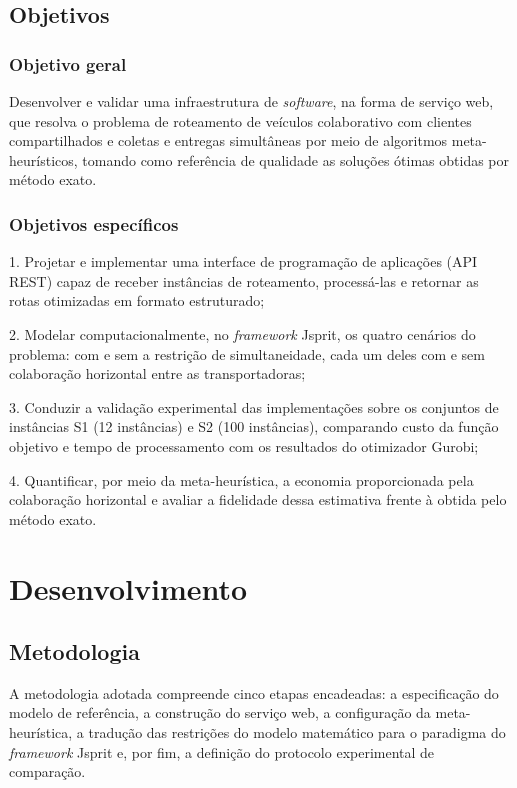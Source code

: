 \documentclass[a4paper,12pt]{article}
\begin{document}
\subsection{Objetivos}
\subsubsection{Objetivo geral}
Desenvolver e validar uma infraestrutura de \textit{software}, na forma de serviço web, que resolva o problema de roteamento de veículos colaborativo com clientes compartilhados e coletas e entregas simultâneas por meio de algoritmos meta-heurísticos, tomando como referência de qualidade as soluções ótimas obtidas por método exato.

\subsubsection{Objetivos específicos}
1. Projetar e implementar uma interface de programação de aplicações (API REST) capaz de receber instâncias de roteamento, processá-las e retornar as rotas otimizadas em formato estruturado;

2. Modelar computacionalmente, no \textit{framework} Jsprit, os quatro cenários do problema: com e sem a restrição de simultaneidade, cada um deles com e sem colaboração horizontal entre as transportadoras;

3. Conduzir a validação experimental das implementações sobre os conjuntos de instâncias S1 (12 instâncias) e S2 (100 instâncias), comparando custo da função objetivo e tempo de processamento com os resultados do otimizador Gurobi;

4. Quantificar, por meio da meta-heurística, a economia proporcionada pela colaboração horizontal e avaliar a fidelidade dessa estimativa frente à obtida pelo método exato.

\section{Desenvolvimento}
\subsection{Metodologia}
\label{sec:metodologia}
A metodologia adotada compreende cinco etapas encadeadas: a especificação do modelo de referência, a construção do serviço web, a configuração da meta-heurística, a tradução das restrições do modelo matemático para o paradigma do \textit{framework} Jsprit e, por fim, a definição do protocolo experimental de comparação.
\end{document}
